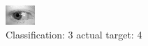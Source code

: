 \begin{figure}[h!]
\begin{center}
\includegraphics[width=0.60\columnwidth]{figures/ID771_class_3_target_4.png}
\end{center}
\caption{ Classification: 3 actual target: 4}
\label{fig:ID771_class_3_target_4}
\end{figure}
